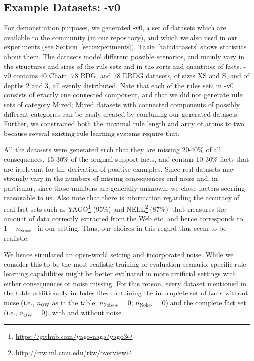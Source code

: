 \documentclass[letterpaper]{article} \usepackage{aaai20}  \usepackage{times}  \usepackage{helvet} \usepackage{courier}  \usepackage[hyphens]{url}  \usepackage{graphicx} \urlstyle{rm} \def\UrlFont{\rm}  \usepackage{graphicx}  \frenchspacing  \setlength{\pdfpagewidth}{8.5in}  \setlength{\pdfpageheight}{11in}  \usepackage{amsthm}
\theoremstyle{definition}
\newcommand{\tool}{\text{RuDaS}\xspace}
\newcommand{\nowa}{\ensuremath{n_{\text{OW}}}\xspace}
\newcommand{\nnoiseadd}{\ensuremath{n_{\text{Noise+}}}\xspace}
\newcommand{\nnoisemiss}{\ensuremath{n_{\text{Noise-}}}\xspace}
\begin{document}
\subsection*{Example Datasets: \tool-v0}\label{sec:generatedDatasets}

For demonstration purposes, we generated \tool-v0, a set of datasets which are available to the community (in our repository), and which we also used in our experiments (see Section~\ref{sec:experiments}).
Table~\ref{tab:datasets}
shows statistics about them.
The datasets model different possible scenarios, and mainly vary in the structures and sizes of the rule sets and in the sorts and quantities of facts. 
\tool-v0 contains 40 Chain, 78 RDG, and 78 DRDG datasets, of sizes XS and S, and of depths 2 and 3, all evenly distributed.
Note that each of the rules sets in \tool-v0 consists of exactly one connected component, and that we did not generate rule sets of category Mixed; Mixed datasets with connected components of possibly different categories can be easily created by combining our generated datasets.  
Further, we constrained both the maximal rule length and arity of atoms to two because several existing rule learning systems require that.

All the datasets were generated such that they are missing 20-40\% of all consequences,  15-30\% of the original support facts, and contain 10-30\% facts that are irrelevant for the derivation of positive examples.
Since real datasets may strongly vary in the numbers of missing consequences and noise and, in particular, since these numbers are generally unknown, we chose factors seeming reasonable to us. Also note that there is information regarding
the accuracy of real fact sets such as YAGO\footnote{\url{https://github.com/yago-naga/yago3}} (95\%) and NELL\footnote{\url{http://rtw.ml.cmu.edu/rtw/overview}} (87\%), that measures the amount of data correctly extracted from the Web etc. and hence corresponds to  $1-\nnoiseadd$ in our setting. Thus, our choices in this regard thus seem to be realistic.


We hence simulated an open-world setting and incorporated noise. While we consider this to be the most realistic training or evaluation scenario, specific rule learning capabilities might be better evaluated
in more artificial settings with either consequences or noise missing. For this reason, every dataset mentioned in the table additionally includes files containing the incomplete set of facts without noise (i.e., $\nowa$ as in the table; $\nnoiseadd=0$; $\nnoisemiss=0$) and the 
complete fact set (i.e., $\nowa=0$), with and without noise.
\end{document}
